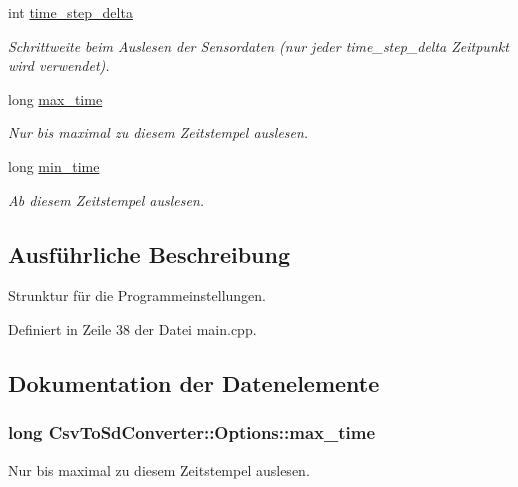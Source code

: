 \begin{DoxyCompactItemize}
int \hyperlink{structCsvToSdConverter_1_1Options_ae9cfb41a40de65e8762ffa89c94302bd}{time\-\_\-step\-\_\-delta}
\begin{DoxyCompactList}\small\item\em Schrittweite beim Auslesen der Sensordaten (nur jeder time\-\_\-step\-\_\-delta Zeitpunkt wird verwendet). \end{DoxyCompactList}\item 
long \hyperlink{structCsvToSdConverter_1_1Options_aed26fc81ee340679696b1b0a3db649ff}{max\-\_\-time}
\begin{DoxyCompactList}\small\item\em Nur bis maximal zu diesem Zeitstempel auslesen. \end{DoxyCompactList}\item 
long \hyperlink{structCsvToSdConverter_1_1Options_a076f7b517fccb4a20dd23905f27b8784}{min\-\_\-time}
\begin{DoxyCompactList}\small\item\em Ab diesem Zeitstempel auslesen. \end{DoxyCompactList}\end{DoxyCompactItemize}


\subsection{Ausführliche Beschreibung}
Strunktur für die Programmeinstellungen. 

Definiert in Zeile 38 der Datei main.\-cpp.



\subsection{Dokumentation der Datenelemente}
\hypertarget{structCsvToSdConverter_1_1Options_aed26fc81ee340679696b1b0a3db649ff}{
\subsubsection[{max\-\_\-time}]{\setlength{\rightskip}{0pt plus 5cm}long Csv\-To\-Sd\-Converter\-::\-Options\-::max\-\_\-time}}\label{structCsvToSdConverter_1_1Options_aed26fc81ee340679696b1b0a3db649ff}


Nur bis maximal zu diesem Zeitstempel auslesen. 



